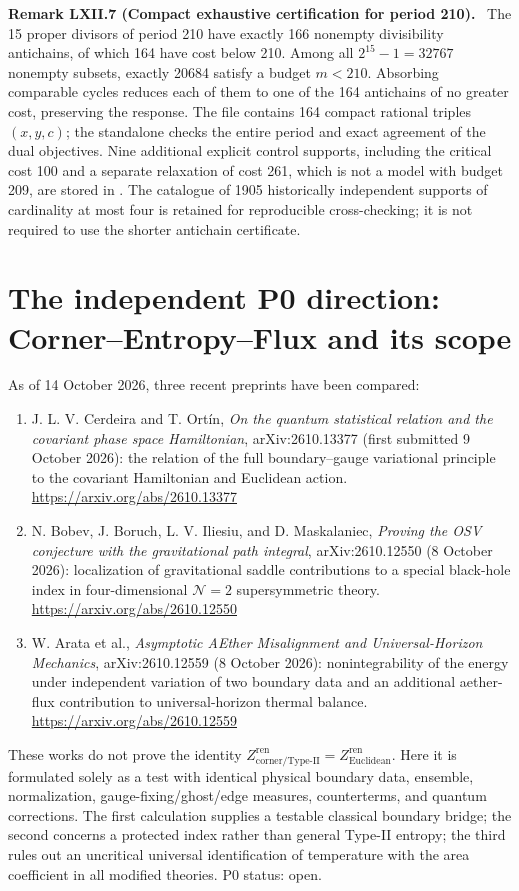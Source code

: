 \documentclass[11pt,a4paper,oneside]{book}
\newcommand{\statement}[3]{\par\medskip\noindent\textbf{#1 #2 (#3).}\ }
\begin{document}
\statement{Remark}{LXII.7}{Compact exhaustive certification for period 210}
The 15 proper divisors of period 210 have exactly 166 nonempty divisibility antichains, of which 164 have cost below 210. Among all $2^{15}-1=32767$ nonempty subsets, exactly 20684 satisfy a budget $m<210$. Absorbing comparable cycles reduces each of them to one of the 164 antichains of no greater cost, preserving the response. The file  contains 164 compact rational triples $(x,y,c)$; the standalone  checks the entire period and exact agreement of the dual objectives. Nine additional explicit control supports, including the critical cost 100 and a separate relaxation of cost 261, which is not a model with budget 209, are stored in . The catalogue of 1905 historically independent supports of cardinality at most four is retained for reproducible cross-checking; it is not required to use the shorter antichain certificate.

\section{The independent P0 direction: Corner--Entropy--Flux and its scope}
As of 14 October 2026, three recent preprints have been compared:
\begin{enumerate}[label=(\alph*)]
\item J. L. V. Cerdeira and T. Ort\'in, \emph{On the quantum statistical relation and the covariant phase space Hamiltonian}, arXiv:2610.13377 (first submitted 9 October 2026): the relation of the full boundary--gauge variational principle to the covariant Hamiltonian and Euclidean action. \url{https://arxiv.org/abs/2610.13377}
\item N. Bobev, J. Boruch, L. V. Iliesiu, and D. Maskalaniec, \emph{Proving the OSV conjecture with the gravitational path integral}, arXiv:2610.12550 (8 October 2026): localization of gravitational saddle contributions to a special black-hole index in four-dimensional $\mathcal N=2$ supersymmetric theory. \url{https://arxiv.org/abs/2610.12550}
\item W. Arata et al., \emph{Asymptotic AEther Misalignment and Universal-Horizon Mechanics}, arXiv:2610.12559 (8 October 2026): nonintegrability of the energy under independent variation of two boundary data and an additional aether-flux contribution to universal-horizon thermal balance. \url{https://arxiv.org/abs/2610.12559}
\end{enumerate}
These works do not prove the identity $Z^{\mathrm{ren}}_{\mathrm{corner/Type\text{-}II}}=Z^{\mathrm{ren}}_{\mathrm{Euclidean}}$. Here it is formulated solely as a test with identical physical boundary data, ensemble, normalization, gauge-fixing/ghost/edge measures, counterterms, and quantum corrections. The first calculation supplies a testable classical boundary bridge; the second concerns a protected index rather than general Type-II entropy; the third rules out an uncritical universal identification of temperature with the area coefficient in all modified theories. P0 status: open.
\end{document}
